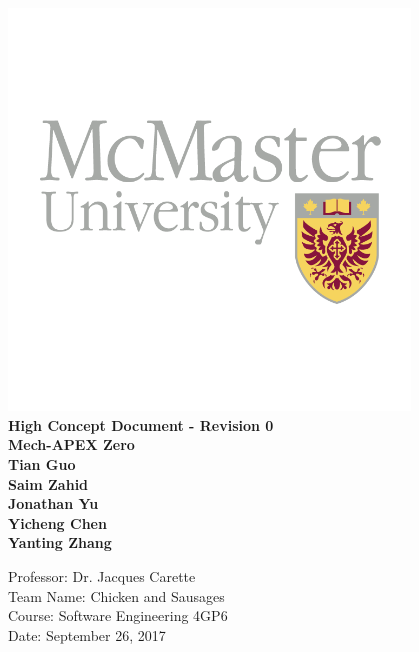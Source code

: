 \documentclass{article}
\begin{document}

\begin{titlepage}
    \begin{center}
        \vspace*{1cm}
        \includegraphics[width=0.8\textwidth]{logo.jpg}
        \\
        \textbf{\Large High Concept Document - Revision 0}
        \vspace{0.5cm}
        \textbf{\Large  \\Mech-APEX Zero}
        \vspace{1cm}
        \textbf{\\Tian Guo\\Saim Zahid\\Jonathan Yu\\ Yicheng Chen \\Yanting Zhang }
        \vfill
        \vspace{0.8cm}
        \begin{flushright}
        Professor: Dr. Jacques Carette\\
        Team Name: Chicken and Sausages\\
        Course: Software Engineering 4GP6\\
        Date: September 26, 2017
        \end{flushright}
    \end{center}
\end{titlepage}
\end{document}
